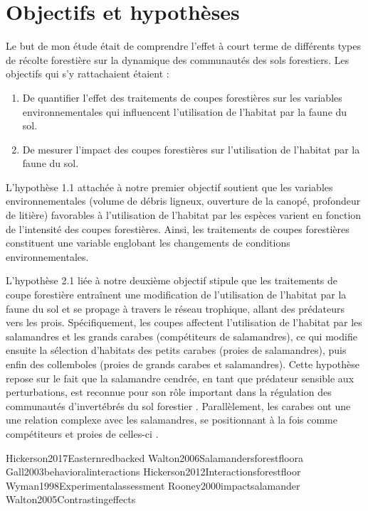 \section*{Objectifs et hypothèses}
\label{sec:objectifs}

Le but de mon étude était de comprendre l’effet à court terme de différents types de récolte forestière sur la dynamique des communautés des sols forestiers. 
Les objectifs qui s’y rattachaient étaient :

\begin{enumerate}
    \item De quantifier l'effet des traitements de coupes forestières sur les variables environnementales qui influencent l'utilisation de l'habitat par la faune du sol. 
    \item De mesurer l'impact des coupes forestières sur l'utilisation de l'habitat par la faune du sol.
\end{enumerate}

L’hypothèse 1.1 attachée à notre premier objectif soutient que les variables environnementales (volume de débris ligneux, ouverture de la canopé, profondeur de litière) favorables à l’utilisation de l’habitat par les espèces varient en fonction de l’intensité des coupes forestières. 
Ainsi, les traitements de coupes forestières constituent une variable englobant les changements de conditions environnementales. 

L'hypothèse 2.1 liée à notre deuxième objectif stipule que les traitements de coupe forestière entraînent une modification de l'utilisation de l'habitat 
par la faune du sol et se propage à travers le réseau trophique, allant des prédateurs vers les prois. 
Spécifiquement, les coupes affectent l'utilisation de l'habitat par les salamandres et les grands carabes (compétiteurs de salamandres), 
ce qui modifie ensuite la sélection d'habitats des petits carabes (proies de salamandres), puis enfin des collemboles (proies de grands carabes et salamandres). 
Cette hypothèse repose sur le fait que la salamandre cendrée, en tant que prédateur sensible aux perturbations, est reconnue pour son rôle important dans la régulation des communautés d'invertébrés du sol forestier \citep{Wyman1998Experimentalassessment,MichaelWalton2005Salamandersforestfloor,Walton2006Salamandersforestfloora,Walton2013Topregulationlitter,Hickerson2017Easternredbacked}. 
Parallèlement, les carabes ont une une relation complexe avec les salamandres, se positionnant à la fois comme compétiteurs et proies de celles-ci \citep{Jaeger1980MicrohabitatsTerrestrial,loveiEcologyBehaviorGround1996,Gall2003behavioralinteractions}. 

Hickerson2017Easternredbacked
Walton2006Salamandersforestfloora
Gall2003behavioralinteractions
Hickerson2012Interactionsforestfloor
Wyman1998Experimentalassessment
Rooney2000impactsalamander
Walton2005Contrastingeffects



\cleardoublepage



